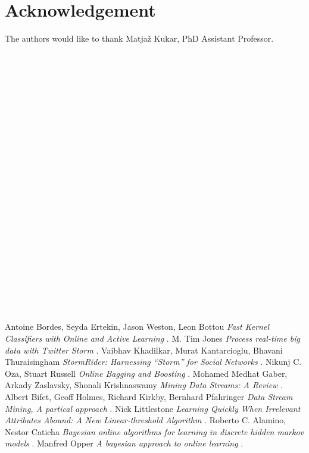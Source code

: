 \documentclass[journal]{IEEEtran/IEEEtran}
\begin{document}
\appendices

\section*{Acknowledgement}
The authors would like to thank Matjaž Kukar, PhD Assistant Professor.
\ \\
\ \\
\ \\
\ \\
\ \\
\ \\
\ \\
\ \\
\ \\
\ \\
\ \\
\ \\
\ \\
\ \\
\ \\
\ \\
\ \\
\ \\
\ \\
\ \\
\ \\
\ \\
\ \\
\ \\

\begin{thebibliography}{1}
 Antoine Bordes, Seyda Ertekin, Jason Weston, Leon Bottou \emph{Fast Kernel Classifiers with Online and Active Learning} .
 M. Tim Jones \emph{Process real-time big data with Twitter Storm} .
 Vaibhav Khadilkar, Murat Kantarcioglu, Bhavani Thuraisingham \emph{StormRider: Harnessing “Storm” for Social Networks} \relax .
 Nikunj C. Oza, Stuart Russell \emph{Online Bagging and Boosting} \relax .
 Mohamed Medhat Gaber, Arkady Zaslavsky, Shonali Krishnaswamy \emph{Mining Data Streams: A Review} \relax .
 Albert Bifet, Geoff Holmes, Richard Kirkby, Bernhard Pfahringer \emph{Data Stream Mining, A partical approach } .
 Nick Littlestone \emph{Learning Quickly When Irrelevant Attributes Abound: A New Linear-threshold Algorithm } .
 Roberto C. Alamino, Nestor Caticha \emph{Bayesian online algorithms for learning in discrete hidden markov models} .
 Manfred Opper \emph{A bayesian approach to online learning} .

\end{thebibliography}
\end{document}
